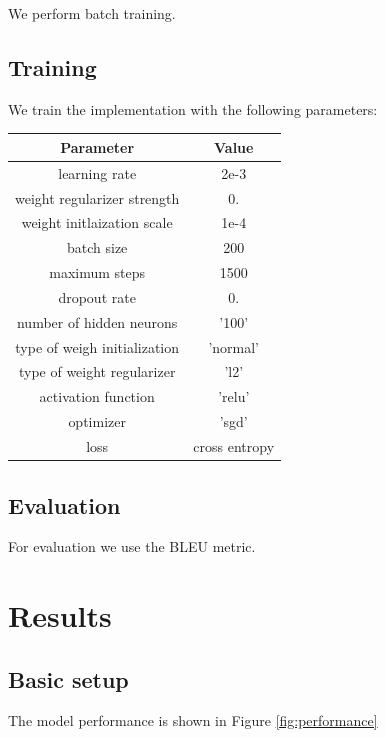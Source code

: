 \documentclass{article}
\begin{document}
We perform batch training. 

\subsection{Training}

We train the implementation with the following parameters: 

\begin{tabular}{|c|c|}
\hline
\textbf{Parameter} & \textbf{Value}\\ \hline \hline
learning rate & 2e-3 \\ \hline
weight regularizer strength & 0. \\ \hline
weight initlaization scale & 1e-4 \\ \hline
batch size & 200 \\ \hline
maximum steps & 1500 \\ \hline
dropout rate & 0. \\ \hline
number of hidden neurons & '100' \\ \hline
type of weigh initialization & 'normal' \\ \hline
type of weight regularizer & 'l2' \\ \hline
activation function & 'relu' \\ \hline
optimizer & 'sgd' \\ \hline
loss & cross entropy \\ \hline
\end{tabular}

\subsection{Evaluation}
For evaluation we use the BLEU metric. 

\section{Results}
\subsection{Basic setup}

The model performance is shown in Figure \ref{fig:performance}
\end{document}
